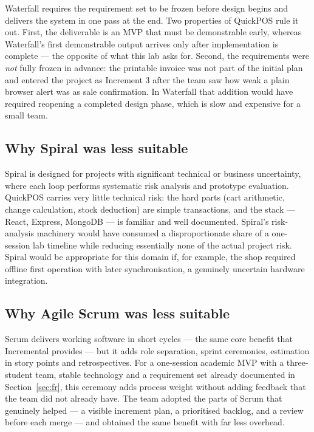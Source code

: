 \documentclass[11pt,a4paper]{article}
\begin{document}
Waterfall requires the requirement set to be frozen before design begins and delivers the
system in one pass at the end. Two properties of QuickPOS rule it out. First, the deliverable
is an MVP that must be demonstrable early, whereas Waterfall's first demonstrable output
arrives only after implementation is complete --- the opposite of what this lab asks for.
Second, the requirements were \emph{not} fully frozen in advance: the printable invoice was
not part of the initial plan and entered the project as Increment 3 after the team saw how
weak a plain browser alert was as sale confirmation. In Waterfall that addition would have
required reopening a completed design phase, which is slow and expensive for a small team.

\subsection{Why Spiral was less suitable}

Spiral is designed for projects with significant technical or business uncertainty, where
each loop performs systematic risk analysis and prototype evaluation. QuickPOS carries very
little technical risk: the hard parts (cart arithmetic, change calculation, stock
deduction) are simple transactions, and the stack --- React, Express, MongoDB --- is familiar
and well documented. Spiral's risk-analysis machinery would have consumed a disproportionate
share of a one-session lab timeline while reducing essentially none of the actual project
risk. Spiral would be appropriate for this domain if, for example, the shop required offline
first operation with later synchronisation, a genuinely uncertain hardware integration.

\subsection{Why Agile Scrum was less suitable}

Scrum delivers working software in short cycles --- the same core benefit that Incremental
provides --- but it adds role separation, sprint ceremonies, estimation in story points and
retrospectives. For a one-session academic MVP with a three-student team, stable technology
and a requirement set already documented in Section~\ref{sec:fr}, this ceremony adds process
weight without adding feedback that the team did not already have. The team adopted the parts
of Scrum that genuinely helped --- a visible increment plan, a prioritised backlog, and a
review before each merge --- and obtained the same benefit with far less overhead.
\end{document}
